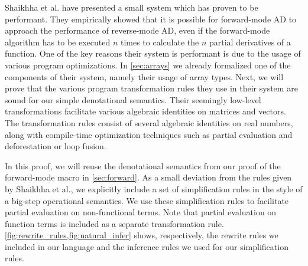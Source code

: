Shaikhha et al. have presented a small system which has proven to be performant\cite{Shaikha2019}.
They empirically showed that it is possible for forward-mode AD to approach the performance of reverse-mode AD, even if the forward-mode algorithm has to be executed $n$ times to calculate the $n$ partial derivatives of a function.
One of the key reasons their system is performant is due to the usage of various program optimizations.
In \cref{sec:arrays} we already formalized one of the components of their system, namely their usage of array types.
Next, we will prove that the various program transformation rules they use in their system are sound for our simple denotational semantics.
Their seemingly low-level transformations facilitate various algebraic identities on matrices and vectors.
The transformation rules consist of several algebraic identities on real numbers, along with compile-time optimization techniques such as partial evaluation and deforestation or loop fusion.

In this proof, we will reuse the denotational semantics from our proof of the forward-mode macro in \cref{sec:forward}.
As a small deviation from the rules given by Shaikhha et al.\cite{Shaikha2019}, we explicitly include a set of simplification rules in the style of a big-step operational semantics.
We use these simplification rules to facilitate partial evaluation on non-functional terms.
Note that partial evaluation on function terms is included as a separate transformation rule.
\cref{fig:rewrite_rules,fig:natural_infer} shows, respectively, the rewrite rules we included in our language and the inference rules we used for our simplification rules.

